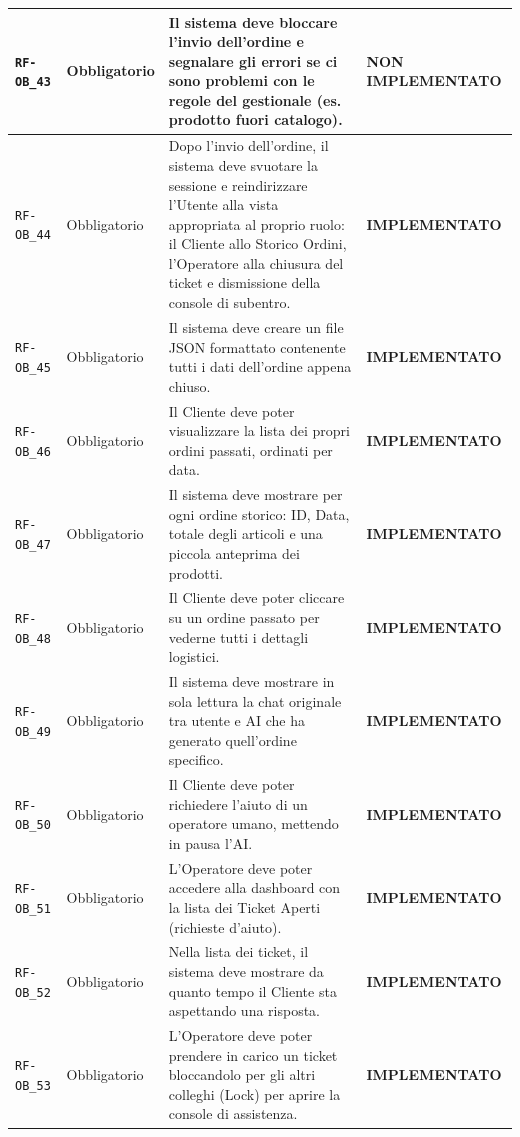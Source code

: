 \documentclass[a4paper, 11pt, oneside]{scrartcl}
\begin{document}
\begin{longtable}{|>{\raggedright\arraybackslash}p{}|>{\raggedright\arraybackslash}p{}|>{\raggedright\arraybackslash}p{}|>{\raggedright\arraybackslash}p{}|}
    \hline
    \texttt{RF-OB\_43} & Obbligatorio & Il sistema deve bloccare l'invio dell'ordine e segnalare gli errori se ci sono problemi con le regole del gestionale (es. prodotto fuori catalogo). & \textbf{NON IMPLEMENTATO} \\
    \hline
    \texttt{RF-OB\_44} & Obbligatorio & Dopo l'invio dell'ordine, il sistema deve svuotare la sessione e reindirizzare l'Utente alla vista appropriata al proprio ruolo: il Cliente allo Storico Ordini, l'Operatore alla chiusura del ticket e dismissione della console di subentro. & \textbf{IMPLEMENTATO} \\
    \hline
    \texttt{RF-OB\_45} & Obbligatorio & Il sistema deve creare un file JSON formattato contenente tutti i dati dell'ordine appena chiuso. & \textbf{IMPLEMENTATO} \\
    \hline
    \texttt{RF-OB\_46} & Obbligatorio & Il Cliente deve poter visualizzare la lista dei propri ordini passati, ordinati per data. & \textbf{IMPLEMENTATO} \\
    \hline
    \texttt{RF-OB\_47} & Obbligatorio & Il sistema deve mostrare per ogni ordine storico: ID, Data, totale degli articoli e una piccola anteprima dei prodotti. & \textbf{IMPLEMENTATO} \\
    \hline
    \texttt{RF-OB\_48} & Obbligatorio & Il Cliente deve poter cliccare su un ordine passato per vederne tutti i dettagli logistici. & \textbf{IMPLEMENTATO} \\
    \hline
    \texttt{RF-OB\_49} & Obbligatorio & Il sistema deve mostrare in sola lettura la chat originale tra utente e AI che ha generato quell'ordine specifico. & \textbf{IMPLEMENTATO} \\
    \hline
    \texttt{RF-OB\_50} & Obbligatorio & Il Cliente deve poter richiedere l'aiuto di un operatore umano, mettendo in pausa l'AI. & \textbf{IMPLEMENTATO} \\
    \hline
    \texttt{RF-OB\_51} & Obbligatorio & L'Operatore deve poter accedere alla dashboard con la lista dei Ticket Aperti (richieste d'aiuto). & \textbf{IMPLEMENTATO} \\
    \hline
    \texttt{RF-OB\_52} & Obbligatorio & Nella lista dei ticket, il sistema deve mostrare da quanto tempo il Cliente sta aspettando una risposta. & \textbf{IMPLEMENTATO} \\
    \hline
    \texttt{RF-OB\_53} & Obbligatorio & L'Operatore deve poter prendere in carico un ticket bloccandolo per gli altri colleghi (Lock) per aprire la console di assistenza. & \textbf{IMPLEMENTATO} \\

\end{longtable}
\end{document}
